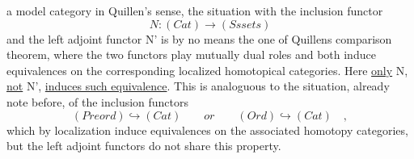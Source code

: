 a model category in Quillen's sense,  the situation with the inclusion
functor
\[ N:(Cat)\longrightarrow (Ss sets) \]
and the left adjoint functor N'  is by no means the one of Quillens
comparison theorem,  where the two functors play mutually dual roles
and both induce equivalences on the corresponding localized homotopical
categories.  Here \uline{only} N,  \uline{not} N',  \uline{induces such equivalence}.  This is
analoguous to the situation,  already note before,  of the inclusion
functors
\[ (Preord)\hookrightarrow (Cat) \qquad or \qquad (Ord)\hookrightarrow (Cat) \quad , \]
which \inserted{[presumably]} by localization induce equivalences on the associated homotopy
categories,  but the left adjoint functors do not share this property.

